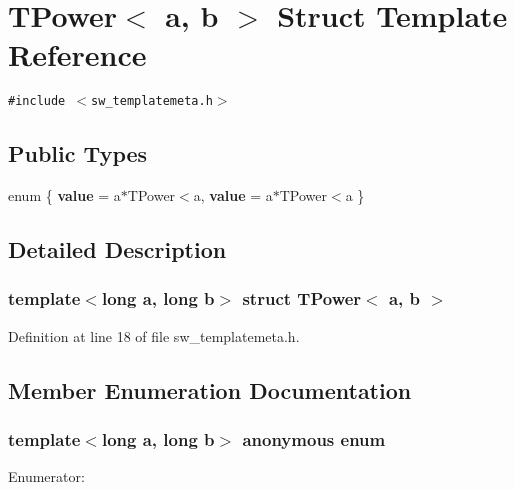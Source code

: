 \section{TPower$<$ a, b $>$ Struct Template Reference}
\label{structTPower}
{\tt \#include $<$sw\_\-templatemeta.h$>$}

\subsection*{Public Types}
\begin{CompactItemize}
\item 
enum \{ {\bf value} =  a$\ast$TPower$<$a, 
{\bf value} =  a$\ast$TPower$<$a
 \}
\end{CompactItemize}


\subsection{Detailed Description}
\subsubsection*{template$<$long a, long b$>$ struct TPower$<$ a, b $>$}



Definition at line 18 of file sw\_\-templatemeta.h.

\subsection{Member Enumeration Documentation}
\subsubsection{\setlength{\rightskip}{0pt plus 5cm}template$<$long a, long b$>$ anonymous enum}\label{structTPower_1348f3841022dd67390b6a7c9b47eab8}


\begin{Desc}
\item[Enumerator: ]\par
\begin{description}
\item[{\em 
value\label{structTPower_1348f3841022dd67390b6a7c9b47eab8642ed8a18afdf744129f8432f3ed37f8}
}]\item[{\em 
value\label{structTPower_1348f3841022dd67390b6a7c9b47eab8642ed8a18afdf744129f8432f3ed37f8}
}]\end{description}
\end{Desc}



